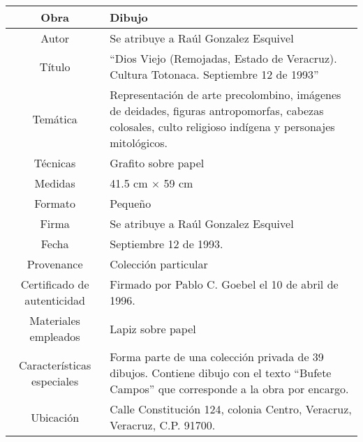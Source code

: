 \begin{table}[H]
\centering
\begin{tabular}{|c|m{}|}
\hline
Obra& Dibujo	\\
\hline
Autor & Se atribuye a Ra\'ul Gonzalez Esquivel\\
\hline
T\'itulo & ``Dios Viejo (Remojadas, Estado de Veracruz). Cultura Totonaca. Septiembre 12 de 1993'' \\
\hline
Tem\'atica & Representaci\'on de arte precolombino, im\'agenes de deidades, figuras antropomorfas, cabezas colosales, culto religioso ind\'igena y personajes mitol\'ogicos.\\
\hline
T\'ecnicas &Grafito sobre papel \\
\hline
Medidas & 41.5 cm $\times$ 59 cm \\
\hline
 Formato & Peque\~no \\
 \hline
 Firma & Se atribuye a Ra\'ul Gonzalez Esquivel \\
 \hline
  Fecha & Septiembre 12 de 1993.\\
 \hline
 Provenance & Colecci\'on particular\\
 \hline
 Certificado de autenticidad& Firmado por Pablo C. Goebel el 10 de abril de 1996.  \\
 \hline 
  Materiales empleados & Lapiz sobre papel\\
 \hline
 Caracter\'isticas especiales & Forma parte de una colecci\'on privada de 39 dibujos. 
Contiene dibujo con el texto ``Bufete Campos'' que corresponde a la obra por encargo. \\
\hline 
Ubicaci\'on & Calle Constituci\'on 124, colonia Centro, Veracruz, Veracruz, C.P. 91700.\\
\hline

\end{tabular}
\end{table}

